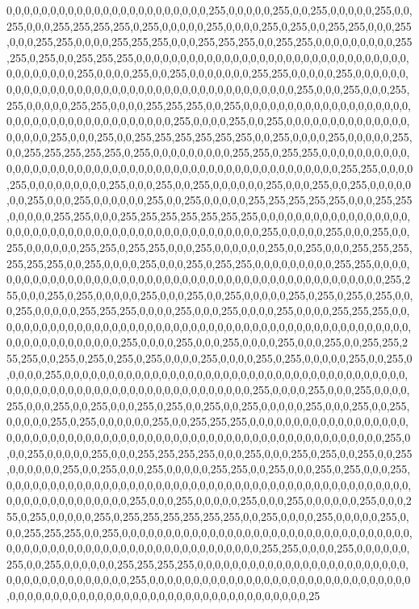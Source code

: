0,0,0,0,0,0,0,0,0,0,0,0,0,0,0,0,0,0,0,0,0,0,0,255,0,0,0,0,0,255,0,0,255,0,0,0,0,0,255,0,0,255,0,0,0,255,255,255,255,0,255,0,0,0,0,0,255,0,0,0,0,255,0,255,0,0,255,255,0,0,0,255,0,0,0,255,255,0,0,0,0,255,255,255,0,0,0,255,255,255,0,0,255,255,0,0,0,0,0,0,0,0,0,255,255,0,255,0,0,255,255,255,0,0,0,0,0,0,0,0,0,0,0,0,0,0,0,0,0,0,0,0,0,0,0,0,0,0,0,0,0,0,0,0,0,0,0,0,0,0,0,255,0,0,0,0,255,0,0,255,0,0,0,0,0,0,0,255,255,0,0,0,0,0,255,0,0,0,0,0,0,0,0,0,0,0,0,0,0,0,0,0,0,0,0,0,0,0,0,0,0,0,0,0,0,0,0,0,0,0,0,0,0,0,255,0,0,0,255,0,0,0,255,255,0,0,0,0,0,255,255,0,0,0,0,255,255,255,0,0,255,0,0,0,0,0,0,0,0,0,0,0,0,0,0,0,0,0,0,0,0,0,0,0,0,0,0,0,0,0,0,0,0,0,0,0,0,0,0,255,0,0,0,0,255,0,0,255,0,0,0,0,0,0,0,0,0,0,0,0,0,0,0,0,0,0,0,255,0,0,0,255,0,0,255,255,255,255,255,255,0,0,255,0,0,0,0,255,0,0,0,0,0,255,0,0,255,255,255,255,255,0,255,0,0,0,0,0,0,0,0,0,255,255,0,255,255,0,0,0,0,0,0,0,0,0,0,0,0,0,0,0,0,0,0,0,0,0,0,0,0,0,0,0,0,0,0,0,0,0,0,0,0,0,0,0,0,0,0,0,0,0,0,0,0,255,255,0,0,0,0,255,0,0,0,0,0,0,0,0,0,255,0,0,0,255,0,0,255,0,0,0,0,0,0,255,0,0,0,255,0,0,255,0,0,0,0,0,0,0,255,0,0,0,255,0,0,0,0,0,0,255,0,0,255,0,0,0,0,0,255,255,255,255,255,0,0,0,255,255,0,0,0,0,0,255,255,0,0,0,255,255,255,255,255,255,255,0,0,0,0,0,0,0,0,0,0,0,0,0,0,0,0,0,0,0,0,0,0,0,0,0,0,0,0,0,0,0,0,0,0,0,0,0,0,0,0,0,0,0,0,0,0,255,0,0,0,0,0,255,0,0,0,255,0,0,255,0,0,0,0,0,0,255,255,0,255,255,0,0,0,255,0,0,0,0,0,0,255,0,0,255,0,0,0,255,255,255,255,255,255,0,0,255,0,0,0,0,255,0,0,0,255,0,255,255,0,0,0,0,0,0,0,0,0,255,255,0,0,0,0,0,0,0,0,0,0,0,0,0,0,0,0,0,0,0,0,0,0,0,0,0,0,0,0,0,0,0,0,0,0,0,0,0,0,0,0,0,0,0,0,0,0,0,255,255,0,0,0,255,0,255,0,0,0,0,0,255,0,0,0,255,0,0,255,0,0,0,0,0,255,0,255,0,255,0,255,0,0,0,255,0,0,0,0,0,255,255,255,0,0,0,0,255,0,0,0,255,0,0,0,0,255,0,0,0,0,255,255,255,0,0,0,0,0,0,0,0,0,0,0,0,0,0,0,0,0,0,0,0,0,0,0,0,0,0,0,0,0,0,0,0,0,0,0,0,0,0,0,0,0,0,0,0,0,0,0,0,0,0,0,0,0,0,0,0,0,0,0,0,0,255,0,0,0,0,255,0,0,0,255,0,0,0,0,255,0,0,0,255,0,0,255,255,255,255,0,0,255,0,255,0,255,0,255,0,0,0,0,255,0,0,0,0,255,0,255,0,0,0,0,0,255,0,0,255,0,0,0,0,0,255,0,0,0,0,0,0,0,0,0,0,0,0,0,0,0,0,0,0,0,0,0,0,0,0,0,0,0,0,0,0,0,0,0,0,0,0,0,0,0,0,0,0,0,0,0,0,0,0,0,0,0,0,0,0,0,0,0,0,0,0,0,0,0,0,0,0,0,255,0,0,0,0,255,0,0,0,255,0,0,0,0,255,0,0,0,255,0,0,255,0,0,0,255,0,255,0,0,255,0,0,255,0,0,0,0,0,255,0,0,0,255,0,0,255,0,0,0,0,0,255,0,255,0,0,0,0,0,0,255,0,0,255,255,255,0,0,0,0,0,0,0,0,0,0,0,0,0,0,0,0,0,0,0,0,0,0,0,0,0,0,0,0,0,0,0,0,0,0,0,0,0,0,0,0,0,0,0,0,0,0,0,0,0,0,0,0,0,0,0,0,0,0,0,0,0,255,0,0,0,255,0,0,0,0,0,255,0,0,0,255,255,255,255,0,0,0,255,0,0,0,255,0,255,0,0,255,0,0,255,0,0,0,0,0,0,255,0,0,255,0,0,0,255,0,0,0,0,0,255,255,0,0,255,0,0,0,255,0,255,0,0,0,255,0,0,0,0,0,0,0,0,0,0,0,0,0,0,0,0,0,0,0,0,0,0,0,0,0,0,0,0,0,0,0,0,0,0,0,0,0,0,0,0,0,0,0,0,0,0,0,0,0,0,0,0,0,0,0,0,0,0,0,0,255,0,0,0,255,0,0,0,0,0,255,0,0,0,255,0,0,0,0,0,0,255,0,0,0,255,0,255,0,0,0,0,0,255,0,255,255,255,255,255,255,0,0,255,0,0,0,0,255,0,0,0,0,0,255,0,0,0,255,255,255,0,0,255,0,0,0,0,0,0,0,0,0,0,0,0,0,0,0,0,0,0,0,0,0,0,0,0,0,0,0,0,0,0,0,0,0,0,0,0,0,0,0,0,0,0,0,0,0,0,0,0,0,0,0,0,0,0,0,0,0,0,0,0,0,0,255,255,0,0,0,0,255,0,0,0,0,0,0,255,0,0,255,0,0,0,0,0,0,255,255,255,255,0,0,0,0,0,0,0,0,0,0,0,0,0,0,0,0,0,0,0,0,0,0,0,0,0,0,0,0,0,0,0,0,0,0,0,0,0,0,255,0,0,0,0,0,0,0,0,0,0,0,0,0,0,0,0,0,0,0,0,0,0,0,0,0,0,0,0,0,0,0,0,0,0,0,0,0,0,0,0,0,0,0,0,0,0,0,0,0,0,0,0,0,0,0,0,0,0,0,0,0,0,0,0,25
